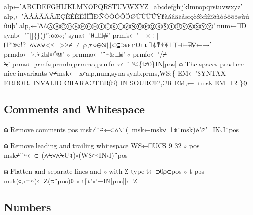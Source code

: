 \documentclass{article}%
\begin{document}
\nwenddocs{}\endmoddef\nwstartdeflinemarkup{}\nwenddeflinemarkup
alp←'ABCDEFGHIJKLMNOPQRSTUVWXYZ_abcdefghijklmnopqrstuvwxyz'
alp,←'ÀÁÂÃÄÅÆÇÈÉÊËÌÍÎÏÐÑÒÓÔÕÖØÙÚÛÜÝßàáâãäåæçèéêëìíîïðñòóôõöøùúûüþ'
alp,←'∆⍙ⒶⒷⒸⒹⒺⒻⒼⒽⒾⒿⓀⓁⓂⓃⓄⓅⓆⓇⓈⓉⓊⓋⓌⓍⓎⓏ'
num←⎕D
synb←'¯[]\{\}()'':⍺⍵⋄;'
syna←'⍬⎕⍞#'
prmfs←'+-×÷|⌈⌊*⍟○!?~∧∨⍲⍱<≤=>≥≠≡≢⍴,⍪⌽⊖⍉↑↓⊂⊆⊃∊⍷∩∪⍳⍸⌷⍋⍒⍎⍕⊥⊤⊣⊢⌹∇←→'
prmdo←'∘.⍣⍠⌺⍤⍥@' ⋄ prmmo←'¨⍨&⌶⌸' ⋄ prmfo←'/⌿\\⍀'
prms←prmfs,prmdo,prmmo,prmfo
x←' '@\{t≠0\}IN[pos] ⍝ The spaces produce nice invariants
∨⌿msk←~x∊alp,num,syna,synb,prms,WS:\{
        EM←'SYNTAX ERROR: INVALID CHARACTER(S) IN SOURCE',CR
        EM,← ⍸msk
        EM ⎕ 2
\}⍬
\nwendcode{}\nwdocspar

\subsection{Comments and Whitespace}

\nwenddocs{}\endmoddef\nwstartdeflinemarkup{}\nwenddeflinemarkup
⍝ Remove comments
pos msk⌿¨⍨←⊂∧⍀¨(~msk←msk∨¯1⌽¨msk)⍲'⍝'=IN∘I¨pos

⍝ Remove leading and trailing whitespace
WS←⎕UCS 9 32 ⋄ pos msk⌿¨⍨←⊂~(∧⍀∨∧⍀U⌽)∘(WS∊⍨IN∘I)¨pos

⍝ Flatten and separate lines and ⋄ with Z type
t←⊃0⍴⊂pos ⋄ t pos msk(∊,∘⍪⍨)←Z(⊃¨pos)0 ⋄ t[⍸'⋄'=IN[pos]]←Z
\nwendcode{}\nwdocspar

\subsection{Numbers}
\end{document}
